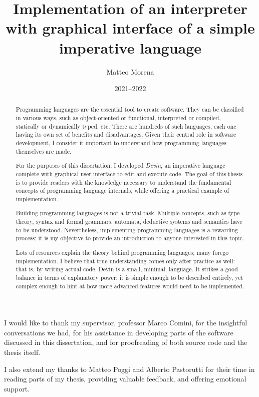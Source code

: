 \documentclass[UdineBachThesis,american,11pt]{PhdThesis}
\author{Matteo Morena}
\date{2021--2022}
\title{Implementation of an interpreter with graphical interface of a simple imperative language}
\begin{document}
  \pagestyle{empty}

  \maketitle

  \cleardoublepage


  \begin{abstract}
    Programming languages are the essential tool to create software. They can be
    classified in various ways, such as object-oriented or functional,
    interpreted or compiled, statically or dynamically typed, etc. There are
    hundreds of such languages, each one having its own set of benefits and
    disadvantages. Given their central role in software development, I consider
    it important to understand how programming languages themselves are made.

    For the purposes of this dissertation, I developed \emph{Devin}, an
    imperative language complete with graphical user interface to edit and
    execute code. The goal of this thesis is to provide readers with the
    knowledge necessary to understand the fundamental concepts of programming
    language internals, while offering a practical example of implementation.

    Building programming languages is not a trivial task. Multiple concepts,
    such as type theory, syntax and formal grammars, automata, deductive systems
    and semantics have to be understood. Nevertheless, implementing programming
    languages is a rewarding process; it is my objective to provide an
    introduction to anyone interested in this topic.

    Lots of resources explain the theory behind programming languages; many
    forego implementation. I believe that true understanding comes only after
    practice as well: that is, by writing actual code. Devin is a small,
    minimal, language. It strikes a good balance in terms of explanatory power:
    it is simple enough to be described entirely, yet complex enough to hint at
    how more advanced features would need to be implemented.
  \end{abstract}


  \begin{acknowledgments}
    I would like to thank my supervisor, professor Marco Comini, for the
    insightful conversations we had, for his assistance in developing parts of
    the software discussed in this dissertation, and for proofreading of both
    source code and the thesis itself.

    I also extend my thanks to Matteo Poggi and Alberto Pastorutti for their
    time in reading parts of my thesis, providing valuable feedback, and
    offering emotional support.
  \end{acknowledgments}
\end{document}
